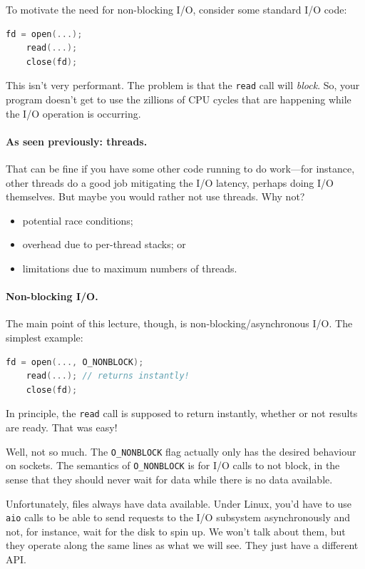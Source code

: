 \documentclass[a4paper]{report}
\begin{document}
To motivate the need for non-blocking I/O, consider some standard I/O code:

\begin{lstlisting}[language=C]
    fd = open(...);
    read(...);
    close(fd);
\end{lstlisting}

This isn't very performant. The problem is that the {\tt read} call will
{\em block}. So, your program doesn't get to use the zillions of CPU cycles that
are happening while the I/O operation is occurring.

\paragraph{As seen previously: threads.} That can be fine if
you have some other code running to do work---for instance, other threads
do a good job mitigating the I/O latency, perhaps doing I/O themselves.
But maybe you would rather not use threads. Why not?

\begin{itemize}
\item potential race conditions;
\item overhead due to per-thread stacks; or
\item limitations due to maximum numbers of threads.
\end{itemize}

\paragraph{Non-blocking I/O.} The main point of this lecture, though,
is non-blocking/asynchronous I/O. The simplest example:

\begin{lstlisting}[language=C]
    fd = open(..., O_NONBLOCK);
    read(...); // returns instantly!
    close(fd);
\end{lstlisting}

In principle, the {\tt read} call is supposed to return instantly,
whether or not results are ready. That was easy!

Well, not so much. The {\tt O\_NONBLOCK} flag actually only has the
desired behaviour on sockets. The semantics of {\tt O\_NONBLOCK} is
for I/O calls to not block, in the sense that they should never wait
for data while there is no data available.

Unfortunately, files always have data available. Under Linux, you'd have
to use {\tt aio} calls to be able to send requests to the I/O subsystem
asynchronously and not, for instance, wait for the disk to spin up.
We won't talk about them, but they operate along the same lines as what
we will see. They just have a different API.
\end{document}
